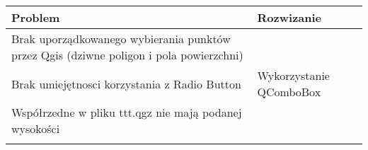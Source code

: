 \begin{table}[h!]
	\centering
	\begin{tabular}{|p{7cm}|p{7cm}|}
		\hline
		Problem  &  Rozwizanie \\
		\hline
		Brak uporządkowanego wybierania punktów przez Qgis (dziwne poligon i pola powierzchni) &    \\ \hline
		Brak umiejętnosci korzystania z Radio Button & Wykorzystanie QComboBox  \\ \hline
		Współrzedne w pliku ttt.qgz nie mają podanej wysokości & \\ \hline
		& \\ \hline
		
	\end{tabular}
\end{table}